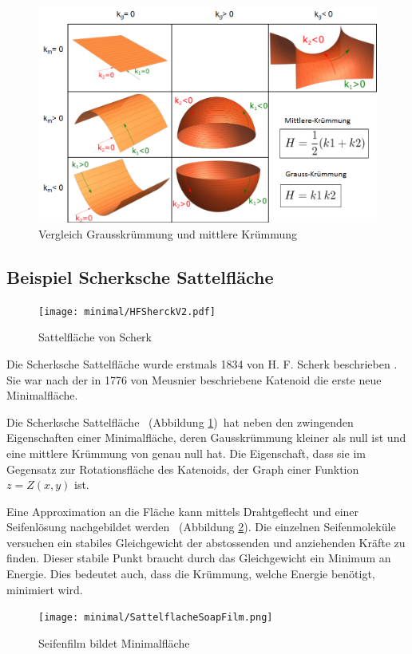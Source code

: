 \begin{refsection}
\begin{figure} 
  \centering
  \includegraphics[scale=0.5]{minimal/Tabelle_Kruemmung.png}
  \caption{Vergleich Grausskrümmung und mittlere Krümmung} 
\end{figure}




\subsection{Beispiel Scherksche Sattelfläche}
\label{minimal:ScherkSattel}
\begin{figure}
  \centering
  \texttt{[image: minimal/HFSherckV2.pdf]}
  \caption{Sattelfläche von Scherk} 
  \label{fig:Scherk}
\end{figure}
Die Scherksche Sattelfläche wurde erstmals 1834 von H. F. Scherk beschrieben \cite{minimal:JournalAM}. Sie war nach der in 1776 von Meusnier beschriebene Katenoid die erste neue Minimalfläche. 

Die Scherksche Sattelfläche \, (Abbildung \ref{fig:Scherk})\, hat neben den zwingenden Eigenschaften einer Minimalfläche, deren Gausskrümmung kleiner als null ist und eine mittlere Krümmung von genau null hat. Die Eigenschaft, dass sie im Gegensatz zur Rotationsfläche des Katenoids, der Graph einer Funktion $z=Z(x,y)$ ist. 

Eine Approximation an die Fläche kann mittels Drahtgeflecht und einer Seifenlösung nachgebildet werden \, (Abbildung \ref{fig:SoapScherk}). Die einzelnen Seifenmoleküle versuchen ein stabiles Gleichgewicht der abstossenden und anziehenden Kräfte zu finden. Dieser stabile Punkt braucht durch das Gleichgewicht ein Minimum an Energie. Dies bedeutet auch, dass die Krümmung, welche Energie benötigt, minimiert wird.
\begin{figure}
  \centering
  \texttt{[image: minimal/SattelflacheSoapFilm.png]}
  \caption{Seifenfilm bildet Minimalfläche} 
  \label{fig:SoapScherk}
\end{figure}



\end{refsection}
